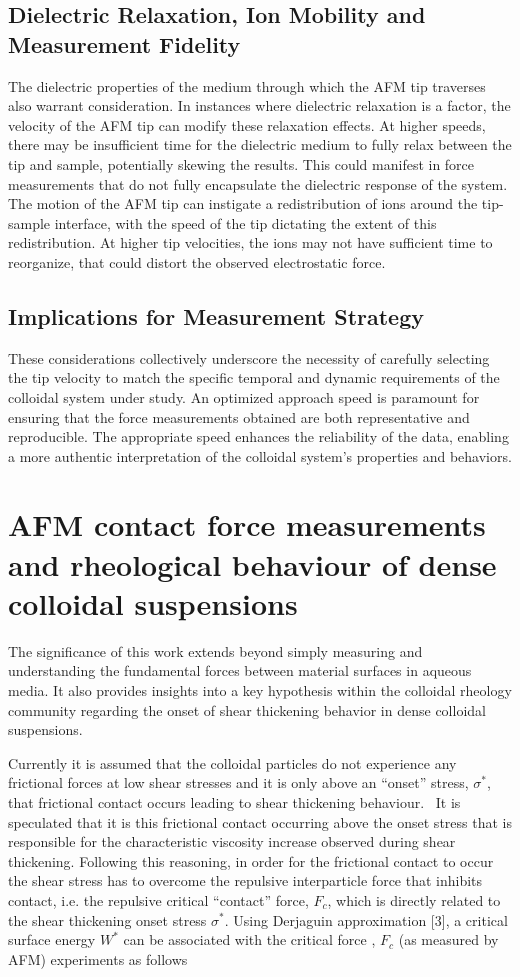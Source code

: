 \subsection{Dielectric Relaxation, Ion Mobility and Measurement Fidelity}
The dielectric properties of the medium through which the AFM tip traverses also warrant consideration. In instances where dielectric relaxation is a factor, the velocity of the AFM tip can modify these relaxation effects. At higher speeds, there may be insufficient time for the dielectric medium to fully relax between the tip and sample, potentially skewing the results. This could manifest in force measurements that do not fully encapsulate the dielectric response of the system. The motion of the AFM tip can instigate a redistribution of ions around the tip-sample interface, with the speed of the tip dictating the extent of this redistribution. At higher tip velocities, the ions may not have sufficient time to reorganize, that could distort the observed electrostatic force. 

\subsection{Implications for Measurement Strategy}
These considerations collectively underscore the necessity of carefully selecting the tip velocity to match the specific temporal and dynamic requirements of the colloidal system under study. An optimized approach speed is paramount for ensuring that the force measurements obtained are both representative and reproducible. The appropriate speed enhances the reliability of the data, enabling a more authentic interpretation of the colloidal system's properties and behaviors.


\section*{AFM contact force measurements and rheological behaviour of dense colloidal suspensions}

The significance of this work extends beyond simply measuring and understanding the fundamental forces between material surfaces in aqueous media. It also provides insights into a key hypothesis within the colloidal rheology community regarding the onset of shear thickening behavior in dense colloidal suspensions.~\cite{reference1}

Currently it is assumed that the colloidal particles do not experience any frictional forces at low shear stresses and it is only above an ``onset'' stress, $\sigma^*$, that frictional contact occurs leading to shear thickening behaviour.~\cite{reference2} It is speculated that it is this frictional contact occurring above the onset stress that is responsible for the characteristic viscosity increase observed during shear thickening. Following this reasoning, in order for the frictional contact to occur the shear stress has to overcome the repulsive interparticle force that inhibits contact, i.e. the repulsive critical “contact” force, $F_c$, which is directly related to the shear thickening onset stress $\sigma^*$. Using Derjaguin approximation [3], a critical surface energy $W^*$ can be associated with the critical force , $F_c$ (as measured by AFM) experiments as follows

